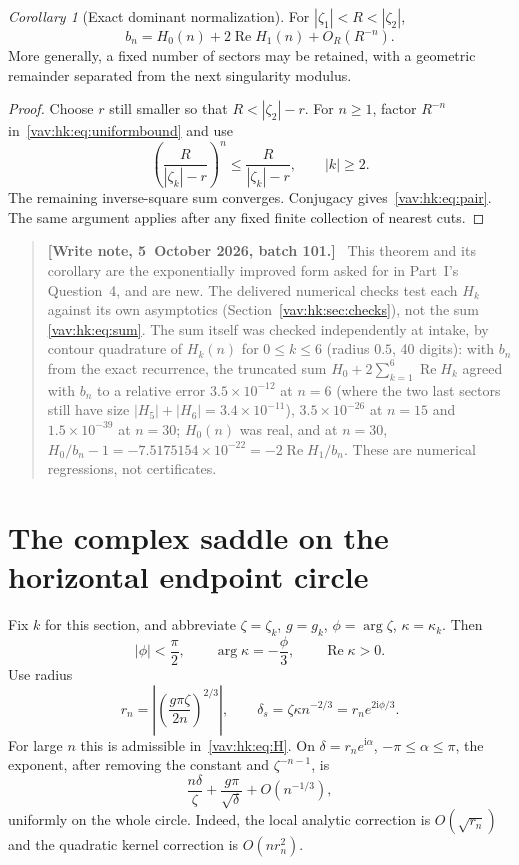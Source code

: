 \documentclass[11pt]{article}
\theoremstyle{remark}\newtheorem{remark}[theorem]{Remark}
\newtheorem{corollary}[theorem]{Corollary}%
\newcommand{\ii}{\mathrm i}
\newenvironment{writenoteb}{\begin{quote}\small\raggedright\textbf{[Write note, 5~October 2026, batch 101.]}\ }{\end{quote}}
\newcommand{\Rea}{\operatorname{Re}}
\begin{document}
\begin{corollary}[Exact dominant normalization]\label{vav:hk:cor:pair}
For $|\zeta_1|<R<|\zeta_2|$,
\begin{equation}\label{vav:hk:eq:pair}
 b_n=H_0(n)+2\Rea H_1(n)+O_R(R^{-n}).
\end{equation}
More generally, a fixed number of sectors may be retained, with a geometric remainder separated from the next singularity modulus.
\end{corollary}
\begin{proof}
Choose $r$ still smaller so that $R<|\zeta_2|-r$. For $n\geq1$, factor $R^{-n}$ in~\eqref{vav:hk:eq:uniformbound} and use
\[
 \left(\frac{R}{|\zeta_k|-r}\right)^n
 \leq\frac{R}{|\zeta_k|-r},\qquad |k|\geq2.
\]
The remaining inverse-square sum converges. Conjugacy gives~\eqref{vav:hk:eq:pair}. The same argument applies after any fixed finite collection of nearest cuts.
\end{proof}
\begin{writenoteb}
This theorem and its corollary are the exponentially improved form asked
for in Part~I's Question~4, and are new. The delivered numerical checks
test each $H_k$ against its own asymptotics (Section~\ref{vav:hk:sec:checks}),
not the sum \eqref{vav:hk:eq:sum}. The sum itself was checked independently
at intake, by contour quadrature of $H_k(n)$ for $0\le k\le6$ (radius
$0.5$, 40 digits): with $b_n$ from the exact recurrence, the truncated sum
$H_0+2\sum_{k=1}^6\Rea H_k$ agreed with $b_n$ to a relative error
$3.5\times10^{-12}$ at $n=6$ (where the two last sectors still have size
$|H_5|+|H_6|=3.4\times10^{-11}$), $3.5\times10^{-26}$ at $n=15$ and
$1.5\times10^{-39}$ at $n=30$; $H_0(n)$ was real, and at $n=30$,
$H_0/b_n-1=-7.5175154\times10^{-22}=-2\Rea H_1/b_n$. These are numerical
regressions, not certificates.
\end{writenoteb}

\section{The complex saddle on the horizontal endpoint circle}\label{vav:hk:sec:saddle}
Fix $k$ for this section, and abbreviate $\zeta=\zeta_k$, $g=g_k$,
$\phi=\arg\zeta$, $\kappa=\kappa_k$. Then
\[
 |\phi|<\frac\pi2,\qquad \arg\kappa=-\frac\phi3,\qquad \Rea\kappa>0.
\]
Use radius
\begin{equation}\label{vav:hk:eq:rn}
 r_n=\left|\left(\frac{g\pi\zeta}{2n}\right)^{2/3}\right|,
 \qquad \delta_s=\zeta\kappa n^{-2/3}=r_ne^{2\ii\phi/3}.
\end{equation}
For large $n$ this is admissible in~\eqref{vav:hk:eq:H}. On $\delta=r_ne^{\ii\alpha}$, $-\pi\leq\alpha\leq\pi$, the exponent, after removing the constant and $\zeta^{-n-1}$, is
\begin{equation}\label{vav:hk:eq:leadphase}
 \frac{n\delta}{\zeta}+\frac{g\pi}{\sqrt\delta}+O(n^{-1/3}),
\end{equation}
uniformly on the whole circle. Indeed, the local analytic correction is $O(\sqrt{r_n})$ and the quadratic kernel correction is $O(nr_n^2)$.
\end{document}
